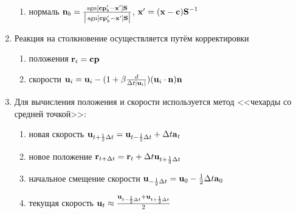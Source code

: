 \begin{enumerate}
\begin{enumerate}
      \item нормаль $\boldsymbol{\mathbf{n}}_b=\frac{\operatorname{sgn}[\boldsymbol{\mathbf{cp}}'_b-\boldsymbol{\mathbf{x}}']\boldsymbol{\mathbf{S}} }{\big|\operatorname{sgn}[\boldsymbol{\mathbf{cp}}'_b-\boldsymbol{\mathbf{x}}']\boldsymbol{\mathbf{S}}\big|}$, \quad $\boldsymbol{\mathbf{x}}'=(\boldsymbol{\mathbf{x}}-\boldsymbol{\mathbf{c}})\boldsymbol{\mathbf{S}}^{-1}$
    \end{enumerate}
  \item Реакция на столкновение осуществляется путём корректировки
    \begin{enumerate}
      \item положения $\boldsymbol{\mathbf{r}}_i=\boldsymbol{\mathbf{cp}}$
      \item скорости $\boldsymbol{\mathbf{u}}_i=\boldsymbol{\mathbf{u}}_i-(1+\beta\frac{d}{\Delta t|\boldsymbol{\mathbf{u}}_i|})(\boldsymbol{\mathbf{u}}_i\cdot \boldsymbol{\mathbf{n}})\boldsymbol{\mathbf{n}}$
    \end{enumerate}
  \item Для вычисления положения и скорости используется метод <<чехарды со средней точкой>>:
    \begin{enumerate}
      \item новая скорость $\boldsymbol{\mathbf{u}}_{t+\frac{1}{2}\Delta t}=\boldsymbol{\mathbf{u}}_{t-\frac{1}{2}\Delta t}+\Delta t\boldsymbol{\mathbf{a}}_t$
      \item новое положение $\boldsymbol{\mathbf{r}}_{t+\Delta t}=\boldsymbol{\mathbf{r}}_t+\Delta t\boldsymbol{\mathbf{u}}_{t+\frac{1}{2}\Delta t}$
      \item начальное смещение скорости $\boldsymbol{\mathbf{u}}_{-\frac{1}{2}\Delta t}=\boldsymbol{\mathbf{u}}_0-\frac{1}{2}\Delta t\boldsymbol{\mathbf{a}}_0$
      \item текущая скорость $\boldsymbol{\mathbf{u}}_t\approx\frac{\boldsymbol{\mathbf{u}}_{t-\frac{1}{2}\Delta t}+\boldsymbol{\mathbf{u}}_{t+\frac{1}{2}\Delta t}}{2}$
    \end{enumerate}
\end{enumerate}

